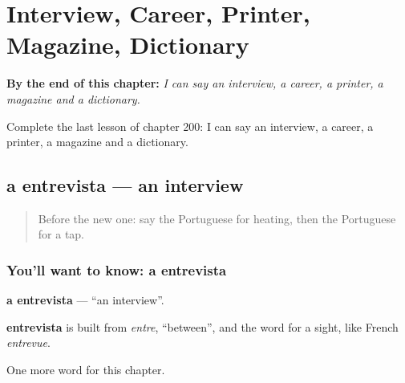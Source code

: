 
\chapter{Interview, Career, Printer, Magazine, Dictionary}
\label{ch:pt-interview-career-printer-magazine-dictionary}

\begin{chapteropening}
\textbf{By the end of this chapter:} \emph{I can say an interview, a career, a printer, a magazine and a dictionary.}

Complete the last lesson of chapter 200: I can say an interview, a career, a printer, a magazine and a dictionary.
\end{chapteropening}

\section[a entrevista]{a entrevista — an interview}

\label{lesson:PT-C200-entrevista}



\begin{quote}
Before the new one: say the Portuguese for heating, then the Portuguese for a tap.
\end{quote}

\subsection*{You'll want to know: a entrevista}
\textbf{a entrevista} — \textquotedblleft{}an interview\textquotedblright{}.

\begin{cousinweb}
\textbf{entrevista} is built from \emph{entre}, \textquotedblleft{}between\textquotedblright{}, and the word for a sight, like French \emph{entrevue}.
\end{cousinweb}

\begin{grammarlens}[title={What you've built}]
One more word for this chapter.
\end{grammarlens}

